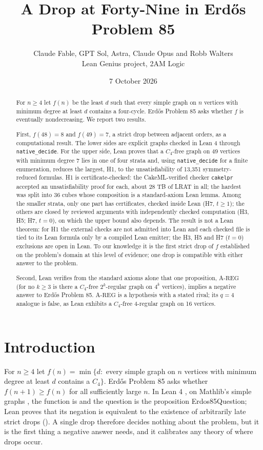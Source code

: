 \documentclass{anvil-paper}
\title{A Drop at Forty-Nine in Erdős Problem 85}
\author{Claude Fable, GPT Sol, Astra, Claude Opus and Robb Walters \\ Lean Genius project, 2AM Logic}
\date{7 October 2026}
\newcommand{\AREG}{\mathrm{A\text{-}REG}}
\newcommand{\Qn}{\textsf{Erdos85Question}}
\newcommand{\cakelpr}{\texttt{cake\textunderscore lpr}}
\theoremstyle{definition}
\begin{document}
\maketitle

\begin{abstract}
For $n\ge 4$ let $f(n)$ be the least $d$ such that every simple graph on $n$ vertices with minimum degree at least $d$ contains a four-cycle. Erdős Problem 85 asks whether $f$ is eventually nondecreasing. We report two results.

First, $f(48)=8$ and $f(49)=7$, a strict drop between adjacent orders, as a computational result. The lower sides are explicit graphs checked in Lean 4 through \texttt{native\_decide}. For the upper side, Lean proves that a $C_4$-free graph on 49 vertices with minimum degree 7 lies in one of four strata and, using \texttt{native\_decide} for a finite enumeration, reduces the largest, H1, to the unsatisfiability of 13,351 symmetry-reduced formulas. H1 is certificate-checked: the CakeML-verified checker \cakelpr{} accepted an unsatisfiability proof for each, about 28 TB of LRAT in all; the hardest was split into 36 cubes whose composition is a standard-axiom Lean lemma. Among the smaller strata, only one part has certificates, checked inside Lean (H7, $t\ge 1$); the others are closed by reviewed arguments with independently checked computation (H3, H5; H7, $t=0$), on which the upper bound also depends. The result is not a Lean theorem: for H1 the external checks are not admitted into Lean and each checked file is tied to its Lean formula only by a compiled Lean emitter; the H3, H5 and H7 ($t=0$) exclusions are open in Lean. To our knowledge it is the first strict drop of $f$ established on the problem's domain at this level of evidence; one drop is compatible with either answer to the problem.

Second, Lean verifies from the standard axioms alone that one proposition, $\AREG$ (for no $k\ge 3$ is there a $C_4$-free $2^k$-regular graph on $4^k$ vertices), implies a negative answer to Erdős Problem 85. $\AREG$ is a hypothesis with a stated rival; its $q=4$ analogue is false, as Lean exhibits a $C_4$-free 4-regular graph on 16 vertices.
\end{abstract}

\section{Introduction}\label{sec:intro}

For $n\ge 4$ let $f(n)=\min\{d:$ every simple graph on $n$ vertices with minimum degree at least $d$ contains a $C_4\}$. Erdős Problem 85 \citep{bloom-erdos85} asks whether $f(n+1)\ge f(n)$ for all sufficiently large $n$. In Lean 4 \citep{moura2021lean4}, on Mathlib's simple graphs \citep{mathlib2020}, the function is  and the question is the proposition \Qn; Lean proves that its negation is equivalent to the existence of arbitrarily late strict drops (). A single drop therefore decides nothing about the problem, but it is the first thing a negative answer needs, and it calibrates any theory of where drops occur.
\end{document}

